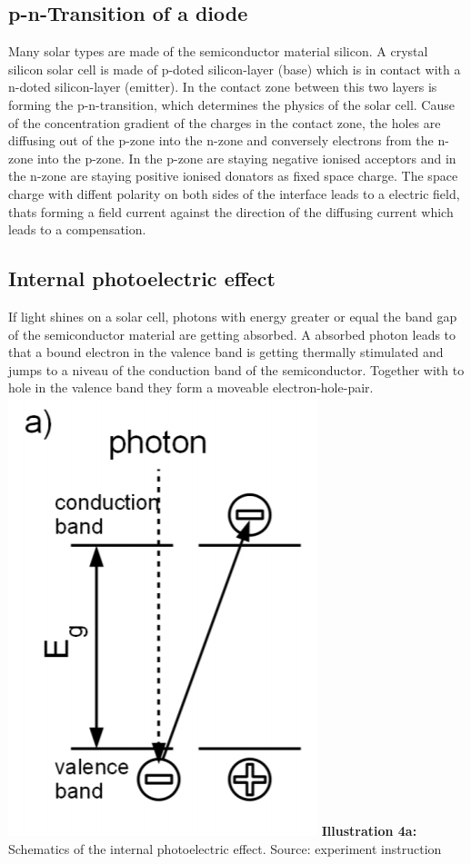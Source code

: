 \documentclass[a4paper, 12pt]{scrartcl}
\begin{document}
\subsection{p-n-Transition of a diode}
Many solar types are made of the semiconductor material silicon. A crystal silicon solar cell is made of p-doted silicon-layer (base) which is in contact with a n-doted silicon-layer (emitter). In the contact zone between this two layers is forming the p-n-transition, which determines the physics of the solar cell. Cause of the concentration gradient of the charges in the contact zone, the holes are diffusing out of the p-zone into the n-zone and conversely electrons from the n-zone into the p-zone. In the p-zone are staying negative ionised acceptors and in the n-zone are staying positive ionised donators as fixed space charge. The space charge with diffent polarity on both sides of the interface leads to a electric field, thats forming a field current against the direction of the diffusing current which leads to a compensation. 
\subsection{Internal photoelectric effect}
If light shines on a solar cell, photons with energy greater or equal the band gap of the semiconductor material are getting absorbed. A absorbed photon leads to that a bound electron in the valence band is getting thermally stimulated and jumps to a niveau of the conduction band of the semiconductor. Together with to hole in the valence band they form a moveable electron-hole-pair. 
\newline 
\hspace*{+6cm}
\includegraphics[scale=0.6]{szpic4}
\newline 
\textbf{Illustration 4a:} Schematics of the internal photoelectric effect. Source: experiment instruction
\end{document}
